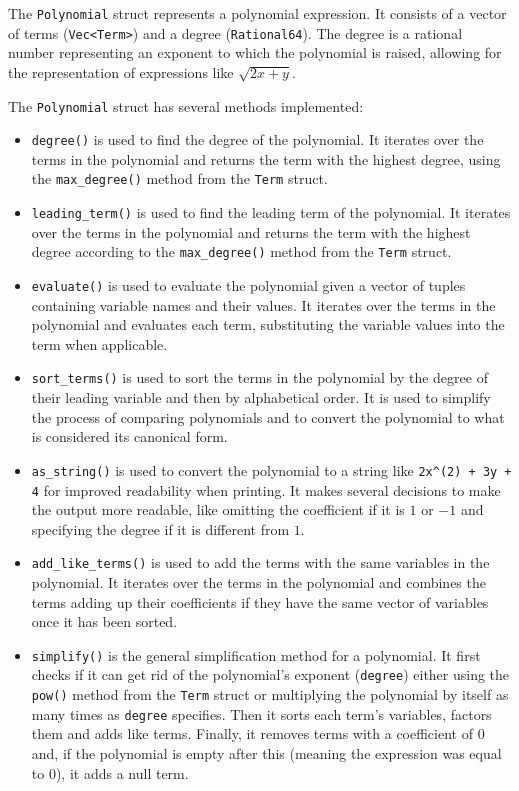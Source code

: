 The \verb|Polynomial| struct represents a polynomial expression. It consists of a vector of terms (\verb|Vec<Term>|) and a degree (\verb|Rational64|). The degree is a rational number representing an exponent to which the polynomial is raised, allowing for the representation of expressions like $\sqrt{2x + y}$.

The \verb|Polynomial| struct has several methods implemented:

\begin{itemize}
    \item \verb|degree()| is used to find the degree of the polynomial. It iterates over the terms in the polynomial and returns the term with the highest degree, using the \verb|max_degree()| method from the \texttt{Term} struct.
    \item \verb|leading_term()| is used to find the leading term of the polynomial. It iterates over the terms in the polynomial and returns the term with the highest degree according to the \verb|max_degree()| method from the \texttt{Term} struct.
    \item \verb|evaluate()| is used to evaluate the polynomial given a vector of tuples containing variable names and their values. It iterates over the terms in the polynomial and evaluates each term, substituting the variable values into the term when applicable.
    \item \verb|sort_terms()| is used to sort the terms in the polynomial by the degree of their leading variable and then by alphabetical order. It is used to simplify the process of comparing polynomials and to convert the polynomial to what is considered its canonical form.
    \item \verb|as_string()| is used to convert the polynomial to a string like \verb|2x^(2) + 3y + 4| for improved readability when printing. It makes several decisions to make the output more readable, like omitting the coefficient if it is $1$ or $-1$ and specifying the degree if it is different from $1$.
    \item \verb|add_like_terms()| is used to add the terms with the same variables in the polynomial. It iterates over the terms in the polynomial and combines the terms adding up their coefficients if they have the same vector of variables once it has been sorted.
    \item \verb|simplify()| is the general simplification method for a polynomial. It first checks if it can get rid of the polynomial's exponent (\verb|degree|) either using the \verb|pow()| method from the \texttt{Term} struct or multiplying the polynomial by itself as many times as \verb|degree| specifies. Then it sorts each term's variables, factors them and adds like terms. Finally, it removes terms with a coefficient of $0$ and, if the polynomial is empty after this (meaning the expression was equal to $0$), it adds a null term.

\end{itemize}
